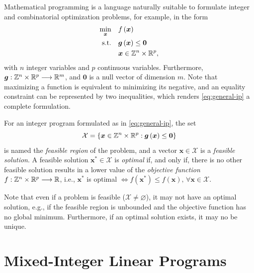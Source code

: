 Mathematical programming is a language naturally suitable to formulate integer and combinatorial optimization problems, for example, in the form
\begin{equation}\label{eq:general-ip}
    \begin{split}
	\min_{\bm{x}} \quad & f\left( \bm{x} \right) \\
	\textrm{s.t.} \quad & \bm{g}\left( \bm{x} \right) \le \bm{0} \\
	  & \bm{x} \in \mathbb{Z}^{n}\times \mathbb{R}^{p}
    ,\end{split}
\end{equation}
with $n$ integer variables and $p$ continuous variables.
Furthermore, $\bm{g}: \mathbb{Z}^{n}\times \mathbb{R}^{p} \longrightarrow \mathbb{R}^{m}$,  and $\bm{0}$ is a null vector of dimension $m$.
Note that maximizing a function is equivalent to minimizing its negative, and an equality constraint can be represented by two inequalities, which renders \eqref{eq:general-ip} a complete formulation.

For an integer program formulated as in \eqref{eq:general-ip}, the set \[
\mathcal{X}=\left\{ \bm{x}\in \mathbb{Z}^{n}\times \mathbb{R}^{p}: \bm{g}\left( \bm{x} \right) \le \bm{0}\right\} 
\] is named the \emph{feasible region} of the problem, and a vector $\bm{x}\in \mathcal{X}$ is a \emph{feasible solution}.
A feasible solution $\bm{x}^{*}\in \mathcal{X}$ is \emph{optimal} if, and only if, there is no other feasible solution results in a lower value of the \emph{objective function} $f: \mathbb{Z}^{n}\times \mathbb{R}^{p} \longrightarrow \mathbb{R}$, i.e., $\bm{x}^{*}$ is optimal $\iff f(\bm{x}^{*}) \le f(\bm{x}) ,\,\forall \bm{x}\in \mathcal{X}$.

Note that even if a problem is feasible ($\mathcal{X}\neq \varnothing$), it may not have an optimal solution, e.g., if the feasible region is unbounded and the objective function has no global minimum.
Furthermore, if an optimal solution exists, it may no be unique.


\section{Mixed-Integer Linear Programs}

